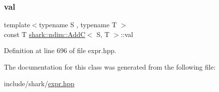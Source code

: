 \subsubsection{\texorpdfstring{val}{val}}
{\footnotesize\ttfamily template$<$typename S , typename T $>$ \\
const T \hyperlink{classshark_1_1ndim_1_1_add_c}{shark\+::ndim\+::\+AddC}$<$ S, T $>$\+::val\hspace{0.3cm}{\ttfamily [private]}}



Definition at line 696 of file expr.\+hpp.



The documentation for this class was generated from the following file\+:\begin{DoxyCompactItemize}
\item 
include/shark/\hyperlink{expr_8hpp}{expr.\+hpp}\end{DoxyCompactItemize}
